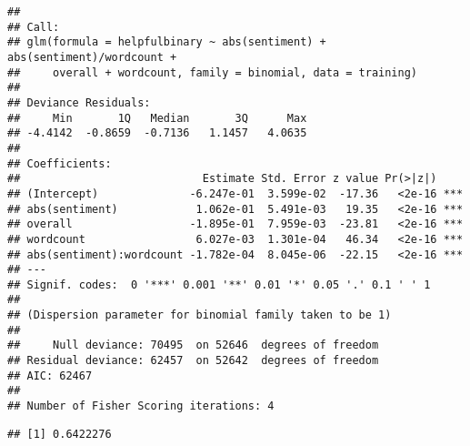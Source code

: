 \documentclass[
]{article}
\newenvironment{Shaded}{\begin{snugshade}}{\end{snugshade}}
\newcommand{\DataTypeTok}[1]{\textcolor[rgb]{0.13,0.29,0.53}{#1}}
\newcommand{\FloatTok}[1]{\textcolor[rgb]{0.00,0.00,0.81}{#1}}
\newcommand{\KeywordTok}[1]{\textcolor[rgb]{0.13,0.29,0.53}{\textbf{#1}}}
\newcommand{\NormalTok}[1]{#1}
\newcommand{\OperatorTok}[1]{\textcolor[rgb]{0.81,0.36,0.00}{\textbf{#1}}}
\newcommand{\StringTok}[1]{\textcolor[rgb]{0.31,0.60,0.02}{#1}}
\begin{document}
\begin{verbatim}
## 
## Call:
## glm(formula = helpfulbinary ~ abs(sentiment) + abs(sentiment)/wordcount + 
##     overall + wordcount, family = binomial, data = training)
## 
## Deviance Residuals: 
##     Min       1Q   Median       3Q      Max  
## -4.4142  -0.8659  -0.7136   1.1457   4.0635  
## 
## Coefficients:
##                            Estimate Std. Error z value Pr(>|z|)    
## (Intercept)              -6.247e-01  3.599e-02  -17.36   <2e-16 ***
## abs(sentiment)            1.062e-01  5.491e-03   19.35   <2e-16 ***
## overall                  -1.895e-01  7.959e-03  -23.81   <2e-16 ***
## wordcount                 6.027e-03  1.301e-04   46.34   <2e-16 ***
## abs(sentiment):wordcount -1.782e-04  8.045e-06  -22.15   <2e-16 ***
## ---
## Signif. codes:  0 '***' 0.001 '**' 0.01 '*' 0.05 '.' 0.1 ' ' 1
## 
## (Dispersion parameter for binomial family taken to be 1)
## 
##     Null deviance: 70495  on 52646  degrees of freedom
## Residual deviance: 62457  on 52642  degrees of freedom
## AIC: 62467
## 
## Number of Fisher Scoring iterations: 4
\end{verbatim}

\begin{Shaded}
\end{Shaded}

\begin{verbatim}
## [1] 0.6422276
\end{verbatim}
\end{document}
